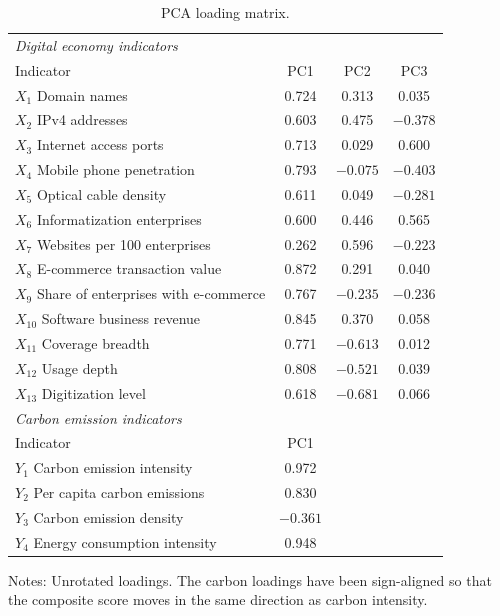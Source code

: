 \documentclass[economies,article,submit,moreauthors]{Definitions/mdpi}
\begin{document}
\begin{table}[H]
\centering
\caption{PCA loading matrix.}
\label{tab:pca_load}
\small
\begin{threeparttable}
\begin{tabular}{lccc}
\toprule
\multicolumn{4}{l}{\textit{Digital economy indicators}}\\
Indicator & PC1 & PC2 & PC3\\
\midrule
$X_1$ Domain names & 0.724 & 0.313 & 0.035\\
$X_2$ IPv4 addresses & 0.603 & 0.475 & $-0.378$\\
$X_3$ Internet access ports & 0.713 & 0.029 & 0.600\\
$X_4$ Mobile phone penetration & 0.793 & $-0.075$ & $-0.403$\\
$X_5$ Optical cable density & 0.611 & 0.049 & $-0.281$\\
$X_6$ Informatization enterprises & 0.600 & 0.446 & 0.565\\
$X_7$ Websites per 100 enterprises & 0.262 & 0.596 & $-0.223$\\
$X_8$ E-commerce transaction value & 0.872 & 0.291 & 0.040\\
$X_9$ Share of enterprises with e-commerce & 0.767 & $-0.235$ & $-0.236$\\
$X_{10}$ Software business revenue & 0.845 & 0.370 & 0.058\\
$X_{11}$ Coverage breadth & 0.771 & $-0.613$ & 0.012\\
$X_{12}$ Usage depth & 0.808 & $-0.521$ & 0.039\\
$X_{13}$ Digitization level & 0.618 & $-0.681$ & 0.066\\
\midrule
\multicolumn{4}{l}{\textit{Carbon emission indicators}}\\
Indicator & PC1 & & \\
\midrule
$Y_1$ Carbon emission intensity & 0.972 & & \\
$Y_2$ Per capita carbon emissions & 0.830 & & \\
$Y_3$ Carbon emission density & $-0.361$ & & \\
$Y_4$ Energy consumption intensity & 0.948 & & \\
\bottomrule
\end{tabular}
\begin{tablenotes}\footnotesize
\item Notes: Unrotated loadings. The carbon loadings have been sign-aligned so that the composite score moves in the same direction as carbon intensity.
\end{tablenotes}
\end{threeparttable}
\end{table}
\end{document}
